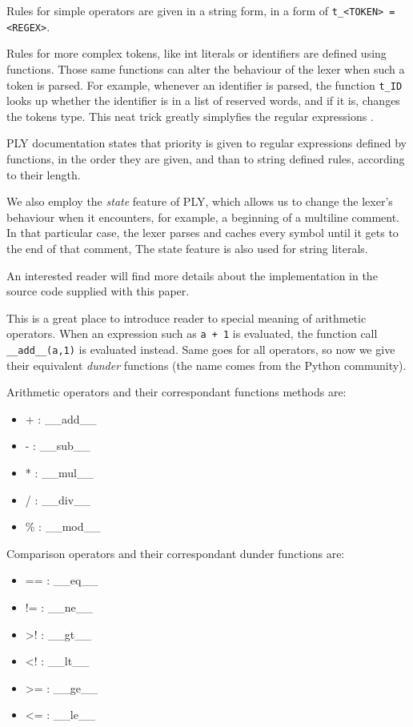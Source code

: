 \documentclass[times, utf8, diplomski]{fer}
\begin{document}
Rules for simple operators are given in a string form, in a form of 
\texttt{t\_<TOKEN> = <REGEX>}.

Rules for more complex tokens, like int literals or identifiers are defined
using functions. Those same functions can alter the behaviour of the
lexer when such a token is parsed. For example, whenever an identifier is parsed,
the function \texttt{t\_ID} looks up whether the identifier is in a list of reserved
words, and if it is, changes the tokens type. This neat trick greatly simplyfies the
regular expressions \citep{c_ply_docs_beazley}.

PLY documentation states that priority is given to regular expressions defined by functions, in the order they are given, and than to string defined rules, according to their length. 

We also employ the \textit{state} feature of PLY, 
which allows us to change the lexer's behaviour
when it encounters, for example, a beginning of a multiline comment. 
In that particular case, the lexer parses and caches every 
symbol until it gets to the end of that comment, 
The state feature is also used for string literals.

An interested reader will find more details about the implementation in
the source code supplied with this paper.

This is a great place to introduce reader to special meaning of arithmetic operators.
When an expression such as \texttt{a + 1} is evaluated, 
the function call \texttt{\_\_add\_\_(a,1)} is evaluated instead.
Same goes for all operators, so now we give their equivalent \textit{dunder} functions 
(the name comes from the Python community). 

Arithmetic operators and their correspondant functions methods are:

\begin{itemize}
    \item + : \_\_add\_\_
    \item - : \_\_sub\_\_
    \item * : \_\_mul\_\_
    \item / : \_\_div\_\_
    \item \% : \_\_mod\_\_
\end{itemize}

Comparison operators and their correspondant dunder functions are:

\begin{itemize}
    \item == : \_\_eq\_\_
    \item != : \_\_ne\_\_
    \item >! : \_\_gt\_\_
    \item <! : \_\_lt\_\_
    \item >= : \_\_ge\_\_
    \item <= : \_\_le\_\_
\end{itemize}
\end{document}
